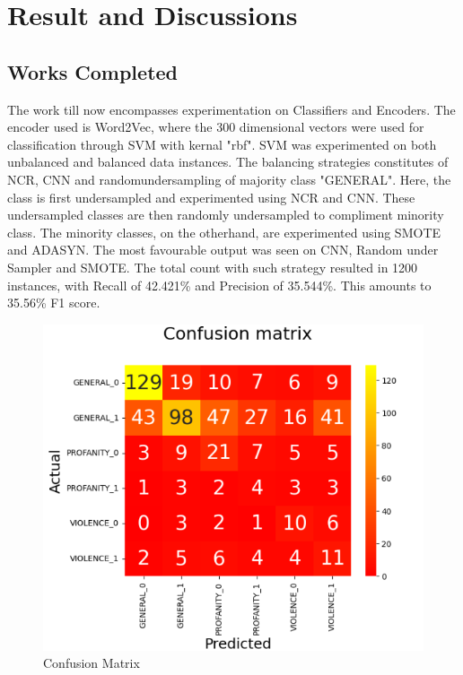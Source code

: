 \chapter{Result and Discussions}
\section{Works Completed}

The work till now encompasses experimentation on Classifiers and Encoders. The encoder used is Word2Vec, where the 300 dimensional vectors were used for classification through SVM with kernal "rbf". SVM was experimented on both unbalanced and balanced data instances. The balancing strategies constitutes of NCR, CNN and randomundersampling of majority class "GENERAL". Here, the class is first undersampled and experimented using NCR and CNN. These undersampled classes are then randomly undersampled to compliment minority class. The minority classes, on the otherhand, are experimented using SMOTE and ADASYN. The most favourable output was seen on CNN, Random under Sampler and SMOTE. The total count with such strategy resulted in 1200 instances, with Recall of 42.421\% and Precision of 35.544\%. This amounts to 35.56\% F1 score.
\begin{figure}[h]
\centering
\includegraphics[scale=0.5]{images/confusion.png}
\caption{Confusion Matrix}
\end{figure}
 
